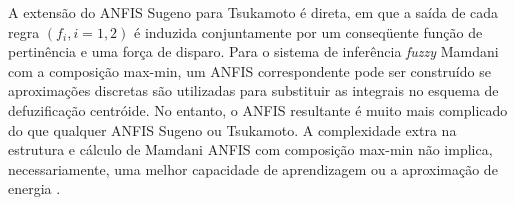A extensão do ANFIS Sugeno para Tsukamoto é direta, em que a saída de cada regra $(f_i, i = 1,2)$ é induzida conjuntamente por um conseqüente função de pertinência e uma força de disparo. Para o sistema de inferência \textit{fuzzy} Mamdani com a composição max-min, um ANFIS correspondente pode ser construído se aproximações discretas são utilizadas para substituir as integrais no esquema de defuzificação centróide. No entanto, o ANFIS resultante é muito mais complicado do que qualquer ANFIS Sugeno ou Tsukamoto. A complexidade extra na estrutura e cálculo de Mamdani ANFIS com composição max-min não implica, necessariamente, uma melhor capacidade de aprendizagem ou a aproximação de energia \cite{jang1997neuro}.

\pagebreak